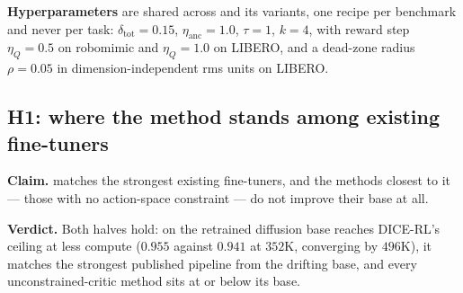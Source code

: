 \textbf{Hyperparameters} are shared across \method{} and its variants, one
recipe per benchmark and never per task: $\delta_{\mathrm{tot}}{=}0.15$,
$\eta_{\mathrm{anc}}{=}1.0$, $\tau{=}1$, $k{=}4$, with reward step
$\eta_Q{=}0.5$ on robomimic and $\eta_Q{=}1.0$ on LIBERO, and a dead-zone
radius $\rho{=}0.05$ in dimension-independent rms units on LIBERO.

\subsection{H1: where the method stands among existing fine-tuners}
\label{sec:exp-baselines}


\textbf{Claim.} \method{} matches the strongest existing fine-tuners, and
the methods closest to it --- those with no action-space constraint --- do
not improve their base at all.

\textbf{Verdict.} Both halves hold: on the retrained diffusion base
\method{} reaches DICE-RL's ceiling at less compute ($0.955$ against $0.941$
at $352$K, converging by $496$K), it matches the strongest published pipeline
from the drifting base, and every unconstrained-critic method sits at or
below its base.

